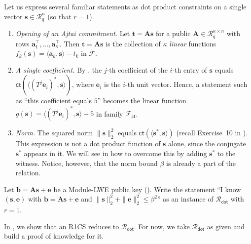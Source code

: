 \documentclass[../../book.tex]{subfiles}
\begin{document}
\begin{example}\label{example:labrador-relation}
    Let us express several familiar statements as dot product constraints on a single vector $\mathbf{s} \in \mathcal{R}_q^n$ (so that $r = 1$).
    \begin{enumerate}
        \item \textit{Opening of an Ajtai commitment.} Let $\mathbf{t} = \mathbf{A}\mathbf{s}$ for a public $\mathbf{A} \in \mathcal{R}_q^{\kappa \times n}$ with rows $\mathbf{a}_1^{\top}, \dots, \mathbf{a}_{\kappa}^{\top}$. Then $\mathbf{t} = \mathbf{A}\mathbf{s}$ is the collection of $\kappa$ \emph{linear} functions $f_k(\mathbf{s}) = \langle \mathbf{a}_k, \mathbf{s} \rangle - t_k$ in $\mathcal{F}$.
        \item \textit{A single coefficient.} By , the $j$-th coefficient of the $i$-th entry of $\mathbf{s}$ equals $\mathsf{ct}(\langle (T^j\mathbf{e}_i)^{\ast}, \mathbf{s} \rangle)$, where $\mathbf{e}_i$ is the $i$-th unit vector. Hence, a statement such as ``this coefficient equals $5$'' becomes the linear function $g(\mathbf{s}) = \langle (T^j\mathbf{e}_i)^{\ast}, \mathbf{s} \rangle - 5$ in family $\mathcal{F}_{\mathsf{ct}}$.
        \item \textit{Norm.} The squared norm $\|\mathbf{s}\|_2^2$ equals $\mathsf{ct}(\langle \mathbf{s}^{\ast}, \mathbf{s} \rangle)$ (recall Exercise~10 in ). This expression is not a dot product function of $\mathbf{s}$ alone, since the conjugate $\mathbf{s}^{\ast}$ appears in it. We will see in  how to overcome this by adding $\mathbf{s}^{\ast}$ to the witness. Notice, however, that the norm bound $\beta$ is already a part of the relation.
    \end{enumerate}
\end{example}

\begin{exercise}\label{exercise:labrador-mlwe-key}
    Let $\mathbf{b} = \mathbf{A}\mathbf{s} + \mathbf{e}$ be a Module-LWE public key ().
    Write the statement ``I know $(\mathbf{s}, \mathbf{e})$ with $\mathbf{b} = \mathbf{A}\mathbf{s} + \mathbf{e}$ and $\|\mathbf{s}\|_2^2 + \|\mathbf{e}\|_2^2 \leq \beta^2$'' as an instance of $\mathcal{R}_{\mathsf{dot}}$ with $r = 1$.
\end{exercise}

In , we show that an R1CS reduces to $\mathcal{R}_{\mathsf{dot}}$.
For now, we take $\mathcal{R}_{\mathsf{dot}}$ as given and build a proof of knowledge for it.
\end{document}
